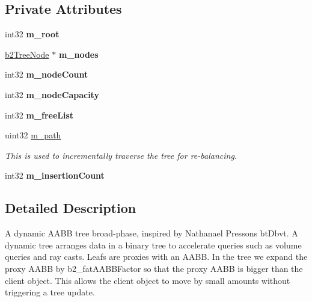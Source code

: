 \subsection*{Private Attributes}
\begin{DoxyCompactItemize}
\item 
\mbox{\label{classb2DynamicTree_a336705eb2059313288e73de8da59b1a9}} 
int32 {\bfseries m\+\_\+root}
\item 
\mbox{\label{classb2DynamicTree_a16ca7b850396a549eb494ed2f1eb5e5c}} 
\mbox{\hyperlink{structb2TreeNode}{b2\+Tree\+Node}} $\ast$ {\bfseries m\+\_\+nodes}
\item 
\mbox{\label{classb2DynamicTree_a7532c57eae4d8e04920dc8c9b14665af}} 
int32 {\bfseries m\+\_\+node\+Count}
\item 
\mbox{\label{classb2DynamicTree_a5b54249f52aee1de21b862ac060eccf2}} 
int32 {\bfseries m\+\_\+node\+Capacity}
\item 
\mbox{\label{classb2DynamicTree_abacc1866e2f5e5fb5e95d69592a4193a}} 
int32 {\bfseries m\+\_\+free\+List}
\item 
\mbox{\label{classb2DynamicTree_ab68ffe92575c26e5d3099d8ed050e188}} 
uint32 \mbox{\hyperlink{classb2DynamicTree_ab68ffe92575c26e5d3099d8ed050e188}{m\+\_\+path}}
\begin{DoxyCompactList}\small\item\em This is used to incrementally traverse the tree for re-\/balancing. \end{DoxyCompactList}\item 
\mbox{\label{classb2DynamicTree_a4657cf0c95a523da397094e5e6943f17}} 
int32 {\bfseries m\+\_\+insertion\+Count}
\end{DoxyCompactItemize}


\subsection{Detailed Description}
A dynamic A\+A\+BB tree broad-\/phase, inspired by Nathanael Presson\textquotesingle{}s bt\+Dbvt. A dynamic tree arranges data in a binary tree to accelerate queries such as volume queries and ray casts. Leafs are proxies with an A\+A\+BB. In the tree we expand the proxy A\+A\+BB by b2\+\_\+fat\+A\+A\+B\+B\+Factor so that the proxy A\+A\+BB is bigger than the client object. This allows the client object to move by small amounts without triggering a tree update.

